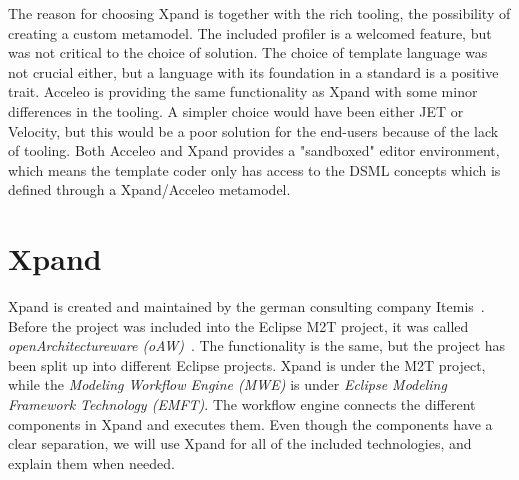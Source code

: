 \begin{table}[htb]  
  \centering
  \caption {Feature comparison in template engines}
  \label{tab:gen_features}
\end{table}
\let\arraystretch\Oldarraystretch
The reason for choosing Xpand is together with the rich tooling, the possibility of creating a custom metamodel. The included profiler is a welcomed feature, but was not critical to the choice of solution. The choice of template language was not crucial either, but a language with its foundation in a standard is a positive trait. Acceleo is providing the same functionality as Xpand with some minor differences in the tooling. A simpler choice would have been either JET or Velocity, but this would be a poor solution for the end-users because of the lack of tooling. Both Acceleo and Xpand provides a "sandboxed" editor environment, which means the template coder only has access to the DSML concepts which is defined through a Xpand/Acceleo metamodel.

\section{Xpand}\label{sec:xpand}
Xpand is created and maintained by the german consulting company Itemis~\cite{itemis}. Before the project was included into the Eclipse M2T project, it was called \emph{openArchitectureware (oAW)}~\cite{OAW08Manual}. The functionality is the same, but the project has been split up into different Eclipse projects. Xpand is under the M2T project, while the \emph{Modeling Workflow Engine (MWE)} is under \emph{Eclipse Modeling Framework Technology (EMFT)}. The workflow engine connects the different components in Xpand and executes them. Even though the components have a clear separation, we will use Xpand for all of the included technologies, and explain them when needed.

